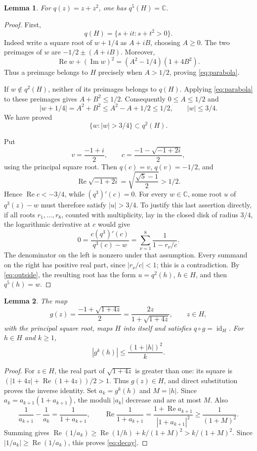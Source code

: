 \documentclass[11pt]{article}
\newtheorem{lemma}{Lemma}
\newcommand{\C}{\mathbb C}
\newcommand{\Rea}{\operatorname{Re}}
\newcommand{\Ima}{\operatorname{Im}}
\begin{document}
\begin{lemma}\label{lem:cover}
For \(q(z)=z+z^2\), one has \(q^5(H)=\C\).
\end{lemma}
\begin{proof}
First,
\begin{equation}\label{eq:parabola}
q(H)=\{s+it:s+t^2>0\}.
\end{equation}
Indeed write a square root of \(w+1/4\) as \(A+iB\), choosing \(A\ge0\).
The two preimages of \(w\) are \(-1/2\pm(A+iB)\). Moreover,
\[
 \Rea w+(\Ima w)^2=(A^2-1/4)(1+4B^2).
\]
Thus a preimage belongs to \(H\) precisely when \(A>1/2\), proving
\eqref{eq:parabola}.

If \(w\notin q^2(H)\), neither of its preimages belongs to \(q(H)\).
Applying \eqref{eq:parabola} to these preimages gives
\(A+B^2\le1/2\). Consequently \(0\le A\le1/2\) and
\[
 |w+1/4|=A^2+B^2\le A^2-A+1/2\le1/2,
 \qquad |w|\le3/4.
\]
We have proved
\begin{equation}\label{eq:outside}
 \{w:|w|>3/4\}\subset q^2(H).
\end{equation}

Put
\[
 v=\frac{-1+i}{2},\qquad
 c=\frac{-1-\sqrt{-1+2i}}2,
\]
using the principal square root. Then \(q(c)=v\), \(q(v)=-1/2\), and
\[
 \Rea\sqrt{-1+2i}
 =\sqrt{\frac{\sqrt5-1}{2}}>1/2.
\]
Hence \(\Rea c<-3/4\), while \((q^3)'(c)=0\).
For every \(w\in\C\), some root \(u\) of \(q^3(z)-w\) must therefore
satisfy \(|u|>3/4\). To justify this last assertion directly, if all
roots \(r_1,\ldots,r_8\), counted with multiplicity, lay in the closed
disk of radius \(3/4\), the logarithmic derivative at \(c\) would give
\[
 0=\frac{c(q^3)'(c)}{q^3(c)-w}
   =\sum_{\nu=1}^8\frac1{1-r_\nu/c}.
\]
The denominator on the left is nonzero under that assumption.
Every summand on the right has positive real part, since \(|r_\nu/c|<1\);
this is a contradiction. By \eqref{eq:outside}, the resulting root
has the form \(u=q^2(h)\), \(h\in H\), and then \(q^5(h)=w\).
\end{proof}

\begin{lemma}\label{lem:inverse}
The map
\[
 g(z)=\frac{-1+\sqrt{1+4z}}2
     =\frac{2z}{1+\sqrt{1+4z}},\qquad z\in H,
\]
with the principal square root, maps \(H\) into itself and satisfies
\(q\circ g=\operatorname{id}_H\). For \(h\in H\) and \(k\ge1\),
\begin{equation}\label{eq:decay}
 |g^k(h)|\le\frac{(1+|h|)^2}{k}.
\end{equation}
\end{lemma}
\begin{proof}
For \(z\in H\), the real part of \(\sqrt{1+4z}\) is greater than one:
its square is
\((|1+4z|+\Rea(1+4z))/2>1\).
Thus \(g(z)\in H\), and direct substitution proves the inverse identity.
Set \(a_k=g^k(h)\) and \(M=|h|\). Since
\(a_k=a_{k+1}(1+a_{k+1})\), the moduli \(|a_k|\) decrease and are at
most \(M\). Also
\[
 \frac1{a_{k+1}}-\frac1{a_k}=\frac1{1+a_{k+1}},\qquad
 \Rea\frac1{1+a_{k+1}}
 =\frac{1+\Rea a_{k+1}}{|1+a_{k+1}|^2}
 \ge\frac1{(1+M)^2}.
\]
Summing gives
\(\Rea(1/a_k)\ge \Rea(1/h)+k/(1+M)^2>k/(1+M)^2\).
Since \(|1/a_k|\ge\Rea(1/a_k)\), this proves \eqref{eq:decay}.
\end{proof}
\end{document}
